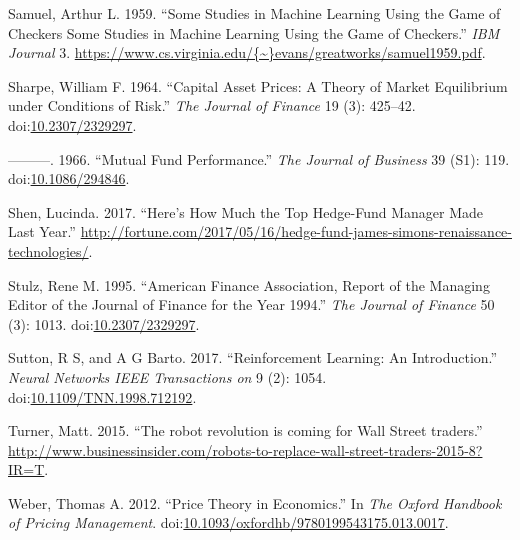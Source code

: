 \documentclass[]{article}
\begin{document}
\hypertarget{ref-Samuel1959}{}
Samuel, Arthur L. 1959. ``Some Studies in Machine Learning Using the
Game of Checkers Some Studies in Machine Learning Using the Game of
Checkers.'' \emph{IBM Journal} 3.
\href{https://www.cs.virginia.edu/\%7B~\%7Devans/greatworks/samuel1959.pdf}{https://www.cs.virginia.edu/\{\textasciitilde{}\}evans/greatworks/samuel1959.pdf}.

\hypertarget{ref-Sharpe1964}{}
Sharpe, William F. 1964. ``Capital Asset Prices: A Theory of Market
Equilibrium under Conditions of Risk.'' \emph{The Journal of Finance} 19
(3): 425--42.
doi:\href{https://doi.org/10.2307/2329297}{10.2307/2329297}.

\hypertarget{ref-Sharpe1966}{}
---------. 1966. ``Mutual Fund Performance.'' \emph{The Journal of
Business} 39 (S1): 119.
doi:\href{https://doi.org/10.1086/294846}{10.1086/294846}.

\hypertarget{ref-Shen2017}{}
Shen, Lucinda. 2017. ``Here's How Much the Top Hedge-Fund Manager Made
Last Year.''
\url{http://fortune.com/2017/05/16/hedge-fund-james-simons-renaissance-technologies/}.

\hypertarget{ref-Markowitz1952}{}
Stulz, Rene M. 1995. ``American Finance Association, Report of the
Managing Editor of the Journal of Finance for the Year 1994.'' \emph{The
Journal of Finance} 50 (3): 1013.
doi:\href{https://doi.org/10.2307/2329297}{10.2307/2329297}.

\hypertarget{ref-Sutton2017}{}
Sutton, R S, and A G Barto. 2017. ``Reinforcement Learning: An
Introduction.'' \emph{Neural Networks IEEE Transactions on} 9 (2): 1054.
doi:\href{https://doi.org/10.1109/TNN.1998.712192}{10.1109/TNN.1998.712192}.

\hypertarget{ref-Turner2015}{}
Turner, Matt. 2015. ``The robot revolution is coming for Wall Street
traders.''
\url{http://www.businessinsider.com/robots-to-replace-wall-street-traders-2015-8?IR=T}.

\hypertarget{ref-Weber2012}{}
Weber, Thomas A. 2012. ``Price Theory in Economics.'' In \emph{The
Oxford Handbook of Pricing Management}.
doi:\href{https://doi.org/10.1093/oxfordhb/9780199543175.013.0017}{10.1093/oxfordhb/9780199543175.013.0017}.
\end{document}
